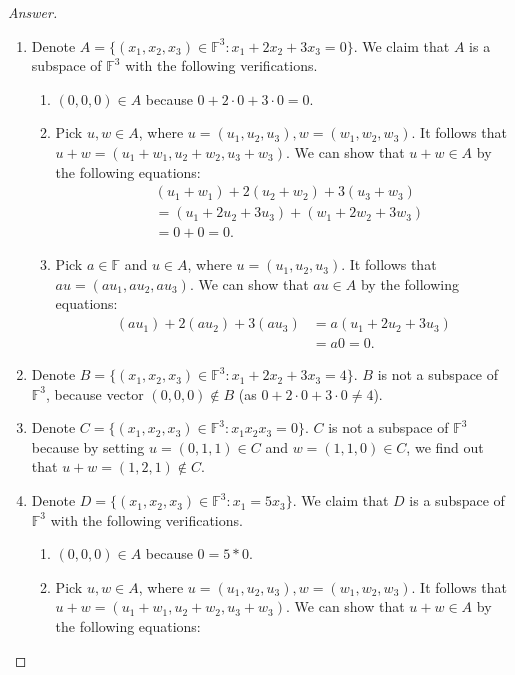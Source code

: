 \begin{proof}[Answer]
\begin{enumerate}[label=(\alph*)]
\item Denote $A=\{(x_1,x_2,x_3)\in\mathbb{F}^3: x_1+2x_2+3x_3=0\}$. We claim that $A$ is a subspace of $\mathbb{F}^3$ with the following verifications.
\begin{enumerate}[label=(\roman*)]
\item $(0,0,0)\in A$ because $0+2\cdot0+3\cdot0=0$.
\item Pick $u,w\in A$, where $u=(u_1,u_2,u_3), w=(w_1,w_2,w_3)$. It follows that $u+w=(u_1+w_1, u_2+w_2, u_3+w_3)$. We can show that $u+w\in A$ by the following equations:
\begin{equation*}
\begin{split}
&(u_1+w_1)+2(u_2+w_2)+3(u_3+w_3)\\
&=(u_1+2u_2+3u_3)+(w_1+2w_2+3w_3)\\
&=0+0=0.
\end{split}
\end{equation*}
\item Pick $a\in \mathbb{F}$ and $u\in A$, where $u=(u_1,u_2,u_3)$. It follows that $au=(au_1,au_2,au_3)$. We can show that $au\in A$ by the following equations:
\begin{equation*}
\begin{split}
(au_1)+2(au_2)+3(au_3)&=a(u_1+2u_2+3u_3)\\
&=a0=0.
\end{split}
\end{equation*}
\end{enumerate}
\item Denote $B=\{(x_1,x_2,x_3)\in\mathbb{F}^3: x_1+2x_2+3x_3=4\}$. $B$ is not a subspace of $\mathbb{F}^3$, because vector $(0,0,0)\notin B$ (as $0+2\cdot0+3\cdot0\ne 4$).
\item Denote $C=\{(x_1,x_2,x_3)\in\mathbb{F}^3: x_1x_2x_3=0\}$. $C$ is not a subspace of $\mathbb{F}^3$ because by setting $u=(0,1,1)\in C$ and $w=(1,1,0)\in C$, we find out that $u+w=(1,2,1) \notin C$.
\item Denote $D=\{(x_1,x_2,x_3)\in\mathbb{F}^3: x_1=5x_3\}$. We claim that $D$ is a subspace of $\mathbb{F}^3$ with the following verifications.
\begin{enumerate}[label=(\roman*)]
\item $(0,0,0)\in A$ because $0=5*0$.
\item Pick $u,w\in A$, where $u=(u_1,u_2,u_3), w=(w_1,w_2,w_3)$. It follows that $u+w=(u_1+w_1, u_2+w_2, u_3+w_3)$. We can show that $u+w\in A$ by the following equations:

\end{enumerate}
\end{enumerate}
\end{proof}

